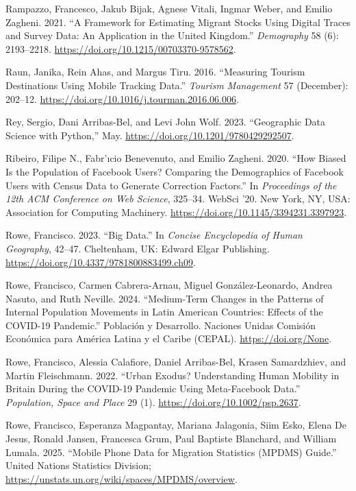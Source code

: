 \documentclass{article}
\newlength{\cslhangindent}
\newenvironment{CSLReferences}[2] %
 {\begin{list}{}{%
  \setlength{\itemindent}{0pt}
  \setlength{\leftmargin}{0pt}
  \setlength{\parsep}{0pt}
  \ifodd #1
   \setlength{\leftmargin}{\cslhangindent}
   \setlength{\itemindent}{-1\cslhangindent}
  \fi
  \setlength{\itemsep}{#2\baselineskip}}}
 {\end{list}}
\begin{document}
\begin{CSLReferences}{1}{0}
Rampazzo, Francesco, Jakub Bijak, Agnese Vitali, Ingmar Weber, and Emilio Zagheni. 2021. {``A Framework for Estimating Migrant Stocks Using Digital Traces and Survey Data: An Application in the United Kingdom.''} \emph{Demography} 58 (6): 2193--2218. \url{https://doi.org/10.1215/00703370-9578562}.

Raun, Janika, Rein Ahas, and Margus Tiru. 2016. {``Measuring Tourism Destinations Using Mobile Tracking Data.''} \emph{Tourism Management} 57 (December): 202--12. \url{https://doi.org/10.1016/j.tourman.2016.06.006}.

Rey, Sergio, Dani Arribas-Bel, and Levi John Wolf. 2023. {``Geographic Data Science with Python,''} May. \url{https://doi.org/10.1201/9780429292507}.

Ribeiro, Filipe N., Fabr'ıcio Benevenuto, and Emilio Zagheni. 2020. {``How Biased Is the Population of Facebook Users? Comparing the Demographics of Facebook Users with Census Data to Generate Correction Factors.''} In \emph{Proceedings of the 12th ACM Conference on Web Science}, 325--34. WebSci '20. New York, NY, USA: Association for Computing Machinery. \url{https://doi.org/10.1145/3394231.3397923}.

Rowe, Francisco. 2023. {``Big Data.''} In \emph{Concise Encyclopedia of Human Geography}, 42--47. Cheltenham, UK: Edward Elgar Publishing. \url{https://doi.org/10.4337/9781800883499.ch09}.

Rowe, Francisco, Carmen Cabrera-Arnau, Miguel González-Leonardo, Andrea Nasuto, and Ruth Neville. 2024. {``Medium-Term Changes in the Patterns of Internal Population Movements in Latin American Countries: Effects of the COVID-19 Pandemic.''} Población y Desarrollo. Naciones Unidas Comisión Económica para América Latina y el Caribe (CEPAL). \url{https://doi.org/None}.

Rowe, Francisco, Alessia Calafiore, Daniel Arribas-Bel, Krasen Samardzhiev, and Martin Fleischmann. 2022. {``Urban Exodus? Understanding Human Mobility in Britain During the COVID{-}19 Pandemic Using Meta{-}Facebook Data.''} \emph{Population, Space and Place} 29 (1). \url{https://doi.org/10.1002/psp.2637}.

Rowe, Francisco, Esperanza Magpantay, Mariana Jalagonia, Siim Esko, Elena De Jesus, Ronald Jansen, Francesca Grum, Paul Baptiste Blanchard, and William Lumala. 2025. {``Mobile Phone Data for Migration Statistics (MPDMS) Guide.''} United Nations Statistics Division; \url{https://unstats.un.org/wiki/spaces/MPDMS/overview}.


\end{CSLReferences}
\end{document}
